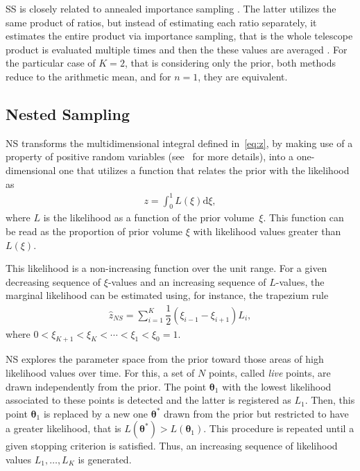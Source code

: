 \documentclass[aps,reprint,amsmath,amssymb,showpacs,showkeys]{revtex4-1}%
\begin{document}
SS is closely related to annealed importance sampling \citep[][]{Neal:2001}.  The latter utilizes the same product of ratios, but instead of estimating each ratio separately, it estimates the entire product via importance sampling, that is the whole telescope product is evaluated multiple times and then the these values are averaged \citep{Maturana:2017}.  For the particular case of $K = 2$, that is considering only the prior, both methods reduce to the arithmetic mean, and for $n =1$, they are equivalent.   


\subsection{Nested Sampling}

NS transforms the multidimensional integral defined in~\eqref{eq:z}, by making use of a property of positive random variables (see~\cite{Maturana:2017b} for more details), into a one-dimensional one that utilizes a function that relates the prior with the likelihood as 
\begin{align*}
z = \int_{0}^{1} L(\xi)\text{d}\xi, 
\end{align*}
where $L$ is the likelihood as a function of the prior volume~$\xi$.  This function can be read as the proportion of prior volume $\xi$ with likelihood values greater than $L(\xi)$. 

This likelihood is a non-increasing function over the unit range.  For a given decreasing sequence of $\xi$-values and an increasing sequence of $L$-values, the marginal likelihood can be estimated using, for instance, the trapezium rule
\begin{align*}
\widehat{z}_{NS} = \sum_{i=1}^{K} \dfrac{1}{2}(\xi_{i-1} - \xi_{i+1})L_i,
\end{align*}
where $0 < \xi_{K+1} < \xi_{K} < \cdots < \xi_1<\xi_0 = 1$.

NS explores the parameter space from the prior toward those areas of high likelihood values over time.  For this, a set of $N$ points, called \textit{live} points, are drawn independently from the prior.  The point $\bm{\theta}_1$ with the lowest likelihood associated to these points is detected and the latter is registered as $L_1$.  Then, this point $\bm{\theta}_1$ is replaced by a new one $\bm{\theta}^*$ drawn from the prior but restricted to have a greater likelihood, that is $L(\bm{\theta}^*) > L(\bm{\theta}_1)$.  This procedure is repeated until a given stopping criterion is satisfied.  Thus, an increasing sequence of likelihood values $L_1, \dots, L_K$ is generated.
\end{document}
